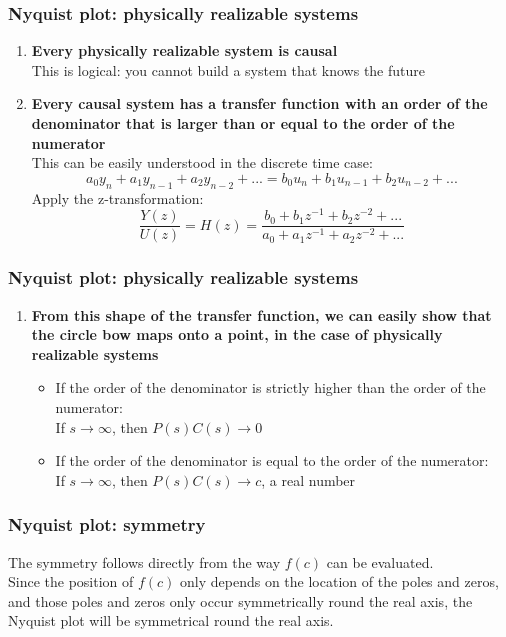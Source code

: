 \newcommand{\asuivre}{\setcounter{sauvegardeenumi}{\theenumi}}
\newcommand{\suite}{\setcounter{enumi}{\thesauvegardeenumi}}

\begin{frame}
	\frametitle{Nyquist plot: physically realizable systems}
	\begin{enumerate}
		\item \textbf{Every physically realizable system is causal}\\
		This is logical: you cannot build a system that knows the future
		\item \textbf{Every causal system has a transfer function with an order of the denominator that is larger than or equal to the order of the numerator}\\
		This can be easily understood in the discrete time case:
		$$a_0y_n + a_1y_{n-1}+a_2y_{n-2}+...=b_0u_n+b_1u_{n-1}+b_2u_{n-2}+...$$
		Apply the z-transformation:
		$$\frac{Y(z)}{U(z)}=H(z)=\frac{b_0+b_1z^{-1}+b_2z^{-2}+...}{a_0+a_1z^{-1}+a_2z^{-2}+...}$$
		\asuivre
	\end{enumerate}
\end{frame}

\begin{frame}
	\frametitle{Nyquist plot: physically realizable systems}
	\vspace{-8ex}
	\begin{enumerate}
		\suite
		\item \textbf{From this shape of the transfer function, we can easily show that the circle bow maps onto a point, in the case of physically realizable systems}\\
		\begin{itemize}
			\item If the order of the denominator is strictly higher than the order of the numerator:\\
			If $s\rightarrow \infty$, then $P(s)C(s)\rightarrow 0$
			\item If the order of the denominator is equal to the order of the numerator:\\
			If $s\rightarrow \infty$, then $P(s)C(s)\rightarrow c$, a real number
		\end{itemize}
	\end{enumerate}
\end{frame}

\begin{frame}
	\frametitle{Nyquist plot: symmetry}
	\vspace{-12ex}
	The symmetry follows directly from the way $f(c)$ can be evaluated.\\
	\medskip
	Since the position of $f(c)$ only depends on the location of the poles and zeros, and those poles and zeros only occur symmetrically round the real axis, the Nyquist plot will be symmetrical round the real axis.
\end{frame}

